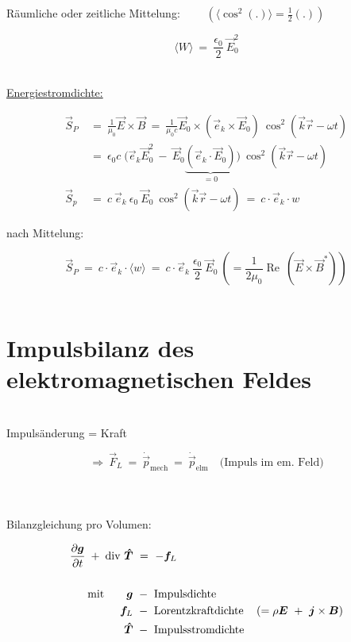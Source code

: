 Räumliche oder zeitliche Mittelung: $\qquad\left(\langle\cos^2(.)\rangle = \frac{1}{2}(.)\right)$

\begin{equation*}
\langle W\rangle \ = \ \frac{\epsilon_0}{2} \ \vec{E}_0^2
\end{equation*}

\ \\
\underline{Energiestromdichte:}

\begin{align*}
\vec{S}_P \ &= \ \frac{1}{\mu_0} \vec{E}\times\vec{B} \ = \ \frac{1}{\mu_0 c} \vec{E}_0 \times \left(\vec{e}_k\times\vec{E}_0\right) \ \cos^2\left(\vec{k}\vec{r}-\omega t\right)\\
&= \ \epsilon_0 c \; \Bigg(\vec{e}_k\vec{E}_0^2 \ - \ \vec{E}_0\underbrace{\left(\vec{e}_k\cdot\vec{E}_0\right)}_{=0}\Bigg) \ \cos^2\left(\vec{k}\vec{r}-\omega t\right)\\
\vec{S}_p \ &= \ c \ \vec{e}_k \ \epsilon_0 \ \vec{E}_0 \ \cos^2 \left(\vec{k}\vec{r}-\omega t\right) \ = \ c \cdot  \vec{e}_k \cdot w
\end{align*}

nach Mittelung:

\begin{equation*}
\vec{S}_P \ = \ c \cdot \vec{e}_k \cdot \langle w\rangle \ = \ c \cdot \vec{e}_k \ \frac{\epsilon_0}{2} \ \vec{E}_0 \ \left( = \frac{1}{2\mu_0} \operatorname{Re} \ (\vec{E}\times\vec{B}^*)\right)
\end{equation*}
\ \\

\section{Impulsbilanz des elektromagnetischen Feldes}
\ \\
Impulsänderung = Kraft

\begin{equation*}
\Rightarrow \ \vec{F}_L \ = \ \dot{\vec{p}}_{\text{mech}} \ = \  \dot{\vec{p}}_{\text{elm}} \quad \text{(Impuls im em. Feld)}
\end{equation*}
\ \\
\ \\
\ \\

Bilanzgleichung pro Volumen:

\begin{align*}
\frac{\partial{\bm{g}}}{\partial{t}} \; + \; \text{div } \bm{\hat{T}} & \ = \ - \bm{f}_L \\
\ \\
\text{mit} \qquad \bm{g} & \ - \ \text{Impulsdichte}\\
\bm{f}_L & \ - \ \text{Lorentzkraftdichte} \quad \left( = \rho\bm{E} \ + \ \bm{j}\times\bm{B}\right)\\
\bm{\hat{T}} & \ - \ \text{Impulsstromdichte}
\end{align*}

